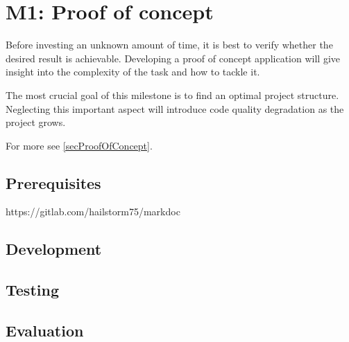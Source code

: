 \chapter{M1: Proof of concept}

Before investing an unknown amount of time, it is best to verify whether the desired result is achievable. Developing a proof of concept application will give insight into the complexity of the task and how to tackle it.

The most crucial goal of this milestone is to find an optimal project structure. Neglecting this important aspect will introduce code quality degradation as the project grows.

For more see \ref{secProofOfConcept}.

\section{Prerequisites}

https://gitlab.com/hailstorm75/markdoc

\section{Development}

\section{Testing}

\section{Evaluation}